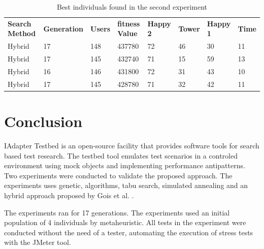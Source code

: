 \begin{table}[h]
\centering
\caption{Best individuals found in the second experiment}
\label{tab:bestindividuals2}
\begin{tabular}{llllllll}
\rowcolor[HTML]{FFCCC9} 
\textbf{Search Method} & \textbf{Generation} & \textbf{Users} & \textbf{fitness Value} & \textbf{Happy 2} & \textbf{Tower} & \textbf{Happy 1} & \textbf{Time} \\ 
\multicolumn{1}{l}{Hybrid} & \multicolumn{1}{l}{17} & \multicolumn{1}{l}{148} & \multicolumn{1}{l}{437780} & \multicolumn{1}{l}{72} & \multicolumn{1}{l}{46} & \multicolumn{1}{l}{30} & \multicolumn{1}{l}{11} \\ 
\multicolumn{1}{l}{Hybrid} & \multicolumn{1}{l}{17} & \multicolumn{1}{l}{145} & \multicolumn{1}{l}{432740} & \multicolumn{1}{l}{71} & \multicolumn{1}{l}{15} & \multicolumn{1}{l}{59} & \multicolumn{1}{l}{13} \\ 
\multicolumn{1}{l}{Hybrid} & \multicolumn{1}{l}{16} & \multicolumn{1}{l}{146} & \multicolumn{1}{l}{431800} & \multicolumn{1}{l}{72} & \multicolumn{1}{l}{31} & \multicolumn{1}{l}{43} & \multicolumn{1}{l}{10} \\ 
\multicolumn{1}{l}{Hybrid} & \multicolumn{1}{l}{17} & \multicolumn{1}{l}{145} & \multicolumn{1}{l}{428780} & \multicolumn{1}{l}{71} & \multicolumn{1}{l}{32} & \multicolumn{1}{l}{42} & \multicolumn{1}{l}{11} \\ 
\end{tabular}
\end{table}

\section{Conclusion}

IAdapter Testbed is an open-source facility that provides software tools for search based test research. The testbed tool emulates test scenarios in a controled environment using mock objects and implementing performance antipatterns.  Two experiments were conducted to validate the proposed approach. The experiments uses genetic, algorithms, tabu search, simulated annealing and an hybrid approach proposed by Gois et al. \cite{Gois2016}.

The experiments ran for 17 generations. The experiments used an initial population of 4 individuals by metaheuristic. All tests in the experiment were conducted without the need of a tester, automating the execution of stress tests with the JMeter tool.

